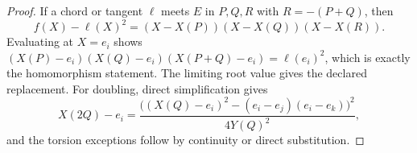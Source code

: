 \documentclass[10pt,a4paper]{amsart}
\begin{document}
\begin{proof}
If a chord or tangent $\ell$ meets $E$ in $P,Q,R$ with $R=-(P+Q)$, then
\[
f(X)-\ell(X)^2=(X-X(P))(X-X(Q))(X-X(R)).
\]
Evaluating at $X=e_i$ shows $(X(P)-e_i)(X(Q)-e_i)(X(P+Q)-e_i)=\ell(e_i)^2$, which is exactly the homomorphism statement. The limiting root value gives the declared replacement. For doubling, direct simplification gives
\[
X(2Q)-e_i=
\frac{\bigl((X(Q)-e_i)^2-(e_i-e_j)(e_i-e_k)\bigr)^2}{4Y(Q)^2},
\]
and the torsion exceptions follow by continuity or direct substitution.
\end{proof}
\end{document}
